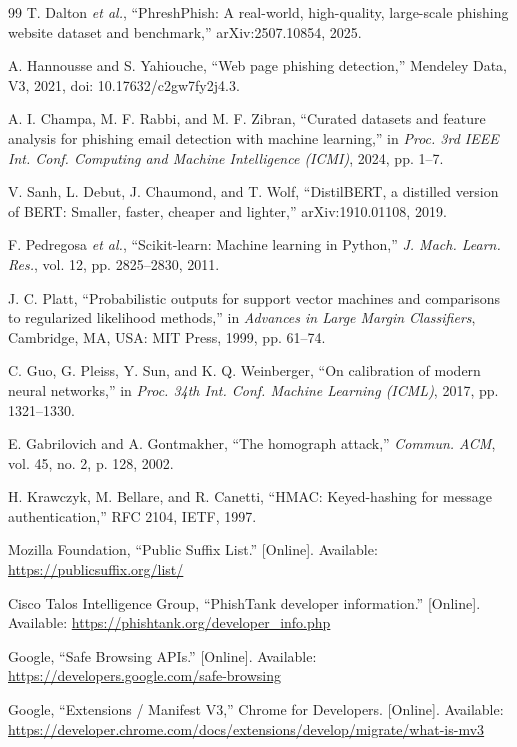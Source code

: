 \begin{thebibliography}{99}
 T. Dalton \textit{et al.}, ``PhreshPhish: A real-world, high-quality, large-scale phishing website dataset and benchmark,'' arXiv:2507.10854, 2025.

 A. Hannousse and S. Yahiouche, ``Web page phishing detection,'' Mendeley Data, V3, 2021, doi: 10.17632/c2gw7fy2j4.3.

 A. I. Champa, M. F. Rabbi, and M. F. Zibran, ``Curated datasets and feature analysis for phishing email detection with machine learning,'' in \textit{Proc. 3rd IEEE Int. Conf. Computing and Machine Intelligence (ICMI)}, 2024, pp. 1--7.

 V. Sanh, L. Debut, J. Chaumond, and T. Wolf, ``DistilBERT, a distilled version of BERT: Smaller, faster, cheaper and lighter,'' arXiv:1910.01108, 2019.

 F. Pedregosa \textit{et al.}, ``Scikit-learn: Machine learning in Python,'' \textit{J. Mach. Learn. Res.}, vol. 12, pp. 2825--2830, 2011.

 J. C. Platt, ``Probabilistic outputs for support vector machines and comparisons to regularized likelihood methods,'' in \textit{Advances in Large Margin Classifiers}, Cambridge, MA, USA: MIT Press, 1999, pp. 61--74.

 C. Guo, G. Pleiss, Y. Sun, and K. Q. Weinberger, ``On calibration of modern neural networks,'' in \textit{Proc. 34th Int. Conf. Machine Learning (ICML)}, 2017, pp. 1321--1330.

 E. Gabrilovich and A. Gontmakher, ``The homograph attack,'' \textit{Commun. ACM}, vol. 45, no. 2, p. 128, 2002.

 H. Krawczyk, M. Bellare, and R. Canetti, ``HMAC: Keyed-hashing for message authentication,'' RFC 2104, IETF, 1997.

 Mozilla Foundation, ``Public Suffix List.'' [Online]. Available: \url{https://publicsuffix.org/list/}

 Cisco Talos Intelligence Group, ``PhishTank developer information.'' [Online]. Available: \url{https://phishtank.org/developer_info.php}

 Google, ``Safe Browsing APIs.'' [Online]. Available: \url{https://developers.google.com/safe-browsing}

 Google, ``Extensions / Manifest V3,'' Chrome for Developers. [Online]. Available: \url{https://developer.chrome.com/docs/extensions/develop/migrate/what-is-mv3}


\end{thebibliography}
